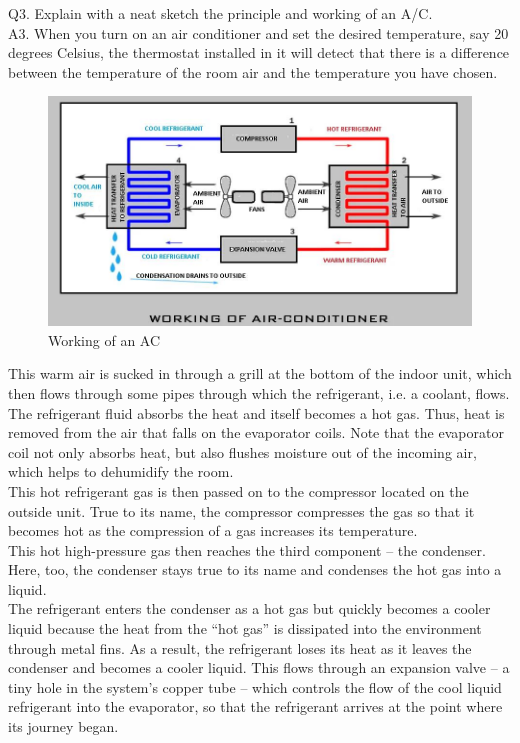 \documentclass[11pt]{article}
\begin{document}
Q3. Explain with a neat sketch the principle and working of an A/C.\\
A3. When you turn on an air conditioner and set the desired temperature, say 20 degrees Celsius, the thermostat installed in it will detect that there is a difference between the temperature of the room air and the temperature you have chosen.\\


\begin{figure}[H]
	\centering
	\includegraphics[scale=0.5]{AC.jpg}
	\caption{Working of an AC \cite{AC}}
	\label{fig:Working of an AC}
\end{figure}


This warm air is sucked in through a grill at the bottom of the indoor unit, which then flows through some pipes through which the refrigerant, i.e. a coolant, flows. The refrigerant fluid absorbs the heat and itself becomes a hot gas. Thus, heat is removed from the air that falls on the evaporator coils. Note that the evaporator coil not only absorbs heat, but also flushes moisture out of the incoming air, which helps to dehumidify the room.\\

This hot refrigerant gas is then passed on to the compressor located on the outside unit. True to its name, the compressor compresses the gas so that it becomes hot as the compression of a gas increases its temperature.\\

This hot high-pressure gas then reaches the third component – the condenser. Here, too, the condenser stays true to its name and condenses the hot gas into a liquid.\\

The refrigerant enters the condenser as a hot gas but quickly becomes a cooler liquid because the heat from the “hot gas” is dissipated into the environment through metal fins. As a result, the refrigerant loses its heat as it leaves the condenser and becomes a cooler liquid. This flows through an expansion valve – a tiny hole in the system’s copper tube – which controls the flow of the cool liquid refrigerant into the evaporator, so that the refrigerant arrives at the point where its journey began.
\end{document}
